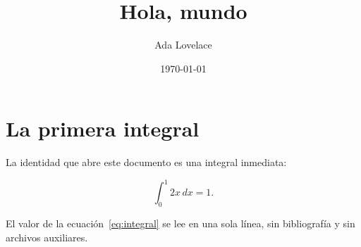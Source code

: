 \documentclass{article}
\title{Hola, mundo}
\author{Ada Lovelace}
\date{\today}
\begin{document}
\maketitle

\section{La primera integral}\label{sec:integral}

La identidad que abre este documento es una integral inmediata:

\begin{equation}
  \int_0^1 2x \, dx = 1.
  \label{eq:integral}
\end{equation}

El valor de la ecuaci\'on~\ref{eq:integral} se lee en una sola l\'inea, sin
bibliograf\'ia y sin archivos auxiliares.
\end{document}
